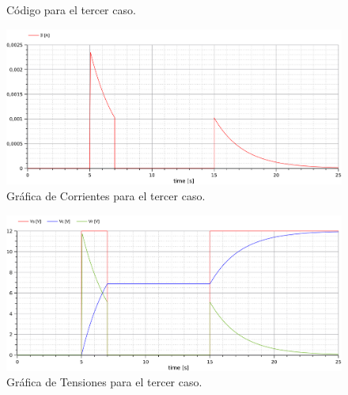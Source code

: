 
%


\begin{figure}[H]
  
  \caption{Código para el tercer caso.}
\end{figure}

\begin{figure}[H]
  \centering
  \label{gr:caso1:corrientes}
  \includegraphics[width=\textwidth]{modelica/graficas/3-corrientes}
  \caption{Gráfica de Corrientes para el tercer caso.}
\end{figure}

\begin{figure}[H]
  \centering
  \label{gr:caso1:tensiones}
  \includegraphics[width=\textwidth]{modelica/graficas/3-tensiones}
  \caption{Gráfica de Tensiones para el tercer caso.}
\end{figure}
